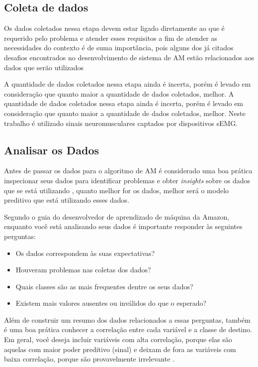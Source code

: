 \subsection{Coleta de dados}

Os dados coletados nessa etapa devem estar ligado diretamente ao que é requerido pelo problema e atender esses requisitos a fim de atender as necessidades do contexto é de suma importância, pois alguns dos já citados desafios encontrados no desenvolvimento de sistema de AM estão relacionados aos dados que serão utilizados \cite{geron2017hands}

A quantidade de dados coletados nessa etapa ainda é incerta, porém é levado em consideração que quanto maior a quantidade de dados coletados, melhor. A quantidade de dados coletados nessa etapa ainda é incerta, porém é levado em consideração que quanto maior a quantidade de dados coletados, melhor. Neste trabalho é utilizado sinais neuromusculares captados por dispositivos sEMG. 

\subsection{Analisar os Dados}

Antes de passar os dados para o algoritmo de AM é considerado uma boa prática inspecionar seus dados para identificar problemas e obter \textit{insights} sobre os dados que se está utilizando \cite{Amazon}, quanto melhor for os dados, melhor será o modelo preditivo que está utilizando esses dados.

Segundo o guia do desenvolvedor de aprendizado de máquina da Amazon, enquanto você está analisando seus dados é importante responder às seguintes perguntas:
\begin{itemize}  
    \item Os dados correspondem às suas expectativas?
    \item Houveram problemas nas coletas dos dados?
    \item Quais classes são as mais frequentes dentre os seus dados?
    \item Existem mais valores ausentes ou inválidos do que o esperado?
\end{itemize}

Além de construir um resumo dos dados relacionados a essas perguntas, também é uma boa prática conhecer a correlação entre cada variável e a classe de destino. Em geral, você deseja incluir variáveis com alta correlação, porque elas são aquelas com maior poder preditivo (sinal) e deixam de fora as variáveis com baixa correlação, porque são provavelmente irrelevante \cite{Amazon}. 

